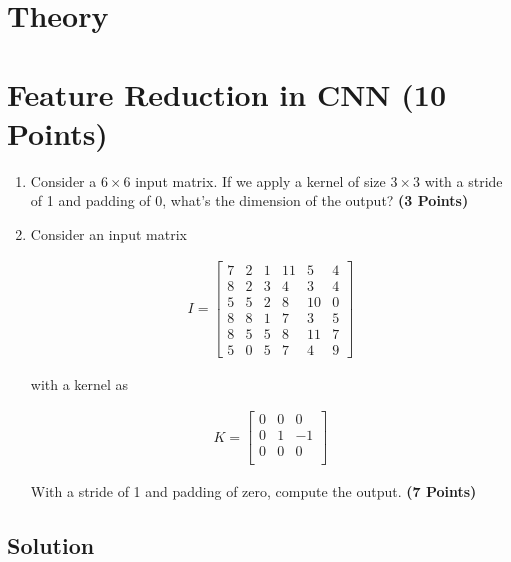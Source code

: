 \documentclass[12pt, xcolor=dvipsnames,svgnames,x11names]{article}
\begin{document}
\section*{Theory}

\section{Feature Reduction in CNN \hfill (10 Points)}

\begin{enumerate}
\item 

Consider a $6\times 6$ input matrix. If we apply a kernel of size $3\times3$ with a stride of 1 and padding of 0, what's the dimension of the output? \hfill \textbf{(3 Points)}




\item 

Consider an input matrix

\begin{align*}
I = \begin{bmatrix}
  7 & 2 & 1 & 11 & 5 & 4 \\
  8 & 2 & 3 & 4 & 3 & 4 \\
  5 & 5 & 2 & 8 & 10 & 0 \\
  8 & 8 & 1 & 7 & 3 & 5 \\
  8 & 5 & 5 & 8 & 11 & 7 \\
  5 & 0 & 5 & 7 & 4 & 9
\end{bmatrix}
\end{align*}


with a kernel as

\begin{align*}
K = \begin{bmatrix}
0 & 0 & 0\\
0 & 1 & -1\\
0 & 0 & 0\\
\end{bmatrix}
\end{align*}


With a stride of 1 and padding of zero, compute the output. \hfill \textbf{(7 Points)}


\end{enumerate}

\subsection{Solution}
\end{document}
